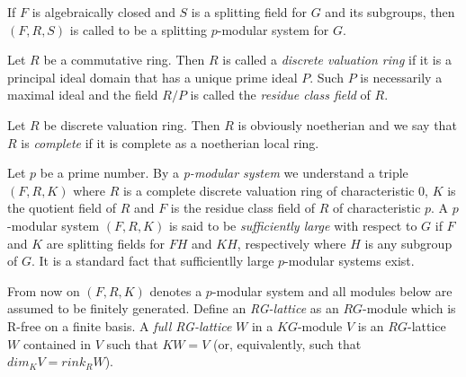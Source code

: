 \documentclass{ctexart}
\begin{document}
\begin{enumerate}
If $F$ is algebraically closed and $S$ is a splitting field for $G$ and its subgroups, then $(F,R,S)$ is called to be a splitting $p$-modular system for $G$.\cite[p.112]{michler2006theory}

Let $R$ be a commutative ring. Then $R$ is called a \textit{discrete valuation ring} if it is a principal ideal domain that has a unique prime ideal $P$. Such $P$ is necessarily a maximal ideal and the field $R/P$ is called the \textit{residue class field} of $R$.

Let $R$ be discrete valuation ring. Then $R$ is obviously noetherian and we say that $R$ is \textit{complete} if it is complete as a noetherian local ring.

Let $p$ be a prime number. By a \textit{p-modular system} we understand a triple $(F,R,K)$ where $R$ is a complete discrete valuation ring of characteristic 0, $K$ is the quotient field of $R$ and $F$ is the residue class field of $R$ of characteristic $p$. A $p$-modular system $(F,R,K)$ is said to be \textit{sufficiently large} with respect to $G$ if $F$ and $K$ are splitting fields for $FH$ and $KH$, respectively where $H$ is any subgroup of $G$. It is a standard fact that sufficientlly large $p$-modular systems exist.

From now on $(F,R,K)$ denotes a $p$-modular system and all modules below are assumed to be finitely generated. Define an \textit{RG-lattice} as an $RG$-module which is R-free on a finite basis. A \textit{full RG-lattice} $W$ in a $KG$-module $V$ is an $RG$-lattice $W$ contained in $V$ such that $KW = V$ (or, equivalently, such that $dim_K V = rink_R W$).\cite[p.307]{karpilovsky1989clifford}\cite[p.140]{karpilovsky2016group}\cite[p.663]{karpilovsky1992part}
\end{enumerate}
\printbibliography
\end{document}
